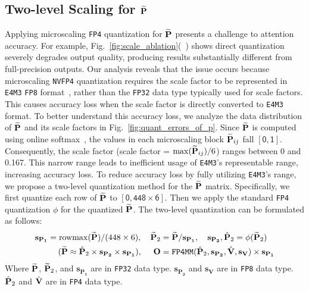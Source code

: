 \subsection{Two-level Scaling for $\widetilde {\mathbf{P}}$}  \label{sec:two_level_quant}
Applying microscaling \texttt{FP4} quantization for $\widetilde {\mathbf{P}}$ presents a challenge to attention accuracy. For example, Fig.~\ref{fig:scale_ablation}(~) shows direct quantization severely degrades output quality, producing results substantially different from full-precision outputs. Our analysis reveals that the issue occurs because microscaling \texttt{NVFP4} quantization requires the scale factor to be represented in \texttt{E4M3} \texttt{FP8} format~\citep{micikevicius2022fp8}, rather than the \texttt{FP32} data type typically used for scale factors. This causes accuracy loss when the scale factor is directly converted to \texttt{E4M3} format. 
To better understand this accuracy loss, we analyze the data distribution of $\widetilde {\mathbf{P}}$ and its scale factors in Fig.~\ref{fig:quant_errors_of_p}. 
Since $\widetilde {\mathbf{P}}$ is computed using online softmax~\citep{milakov2018online}, the values in each microscaling block $\widetilde {\mathbf{P}}_{ij}$ fall $\mathsf{[0, 1]}$. Consequently, the scale factor (scale factor = $\max(\widetilde {\mathbf{P}}_{ij})/6$) ranges between 0 and 0.167. This narrow range leads to inefficient usage of \texttt{E4M3}'s representable range, increasing accuracy loss. To reduce accuracy loss by fully utilizing \texttt{E4M3}'s range, we propose a two-level quantization method for the $\widetilde {\mathbf{P}}$ matrix. Specifically, we first quantize each row of $\widetilde {\mathbf{P}}$ to $\mathsf{[0, 448 \times 6]}$. Then we apply the standard \texttt{FP4} quantization $\phi$ for the quantized $\widetilde {\mathbf{P}}$. The two-level quantization can be formulated as follows:
\begin{align}
    \mathbf{s_{P_1}} = \mathrm{rowmax}(\widetilde {\mathbf{P}}) / (448 \times 6), ~~~
    \widetilde {\mathbf{P}}_2 &= \widetilde {\mathbf{P}} / \mathbf{s_{P_1}}, ~~~
    \mathbf{s_{P_2}}, \hat {\mathbf{P}}_2 = \phi (\widetilde {\mathbf{P}}_2) \notag\\
    (\widetilde {\mathbf{P}} \approx \hat {\mathbf{P}}_2 \times \mathbf{s_{P_2}} \times \mathbf{s_{P_1}}), ~~~~
    \mathbf{O} &= \texttt{FP4MM}(\hat {\mathbf{P}}_2, \mathbf{s_{P_2}}, \hat {\mathbf{V}}, \mathbf{s_V}) \times \mathbf{s_{P_1}}
\end{align}
Where $\widetilde {\mathbf{P}}$, $\widetilde {\mathbf{P}}_2$, and $\mathbf{s_{P_1}}$ are in \texttt{FP32} data type. $\mathbf{s_{P_2}}$ and $\mathbf{s_V}$ are in  \texttt{FP8}  data type. $\hat {\mathbf{P}}_2$ and $\hat {\mathbf{V}}$ are in \texttt{FP4} data type.


